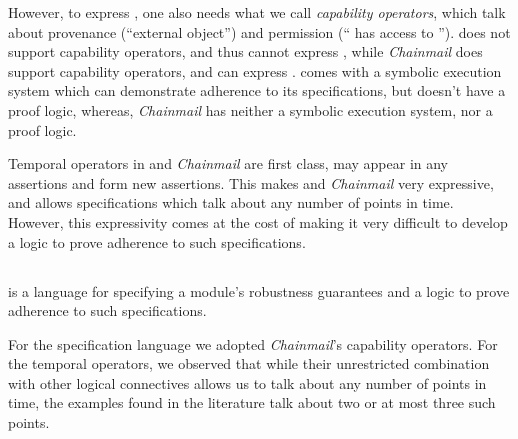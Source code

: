  {However, to express \SrobustB, one also needs what we call \emph{capability operators}, which talk about 
 provenance (``external object'') and
  permission (`` has access to ''). 
   {}  does not support capability operators, and thus cannot express   \SrobustB, 
   while  \emph{Chainmail} does support capability operators, and can express  \SrobustB. 
}  
 {} comes with a symbolic 
  execution system which can demonstrate adherence to its specifications, but doesn't have a proof logic, %
   whereas, \emph{Chainmail}   {has neither a symbolic execution system, nor a proof logic.}
  
 {Temporal operators in {}   and  \emph{Chainmail}  are first class, \ie may appear in any assertions 
and form new assertions. This makes {}   and  \emph{Chainmail} very expressive,
and allows specifications which talk about any number of points in time.
However, this expressivity comes at the cost of making it very difficult to develop a logic to
prove adherence to such specifications.}
  
\vspace{.04in}

\subsection{\Nec}
\label{intro:this:work}
\Nec is a language for specifying a module's robustness guarantees 
and a logic 
to prove adherence to such specifications.

For the specification language we adopted  
\emph{Chainmail}'s    capability operators.
{For the 
  temporal operators, we observed that while their
   unrestricted combination with  other logical connectives allows us to talk about any
   number of points in time, the examples found in the literature talk about two or at most three such points. }

